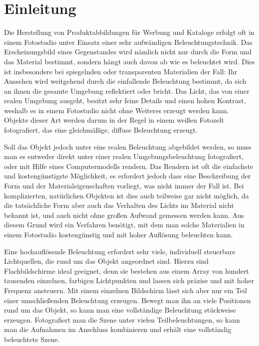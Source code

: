 \chapter{Einleitung}  \label{einleitung}

 Die Herstellung von Produktabbildungen für Werbung und Kataloge erfolgt oft in einem Fotostudio unter Einsatz einer sehr aufwändigen Beleuchtungstechnik.
 Das Erscheinungsbild eines Gegenstandes wird nämlich nicht nur durch die Form und das Material bestimmt, sondern hängt auch davon ab wie es beleuchtet wird.
  Dies ist insbesondere bei spiegelnden oder transparenten Materialien der Fall: Ihr Aussehen wird weitgehend durch die einfallende Beleuchtung bestimmt, da sich an ihnen die gesamte Umgebung reflektiert oder bricht.
  Das Licht, das von einer realen Umgebung ausgeht, besitzt sehr feine Details und einen hohen Kontrast, weshalb es in einem Fotostudio nicht ohne Weiteres erzeugt werden kann.
  Objekte dieser Art werden darum in der Regel in einem weißen Fotozelt fotografiert, das eine gleichmäßige, diffuse Beleuchtung erzeugt. 
  
  Soll das Objekt jedoch unter eine realen Beleuchtung abgebildet werden, so muss man es entweder direkt unter einer realen Umgebungsbeleuchtung fotografiert, oder mit Hilfe eines Computermodells rendern.
  Das Rendern ist oft die einfachste und kostengünstigste Möglichkeit, es erfordert jedoch dass eine Beschreibung der Form und der Materialeigenschaften vorliegt, was nicht immer der Fall ist.
  Bei komplizierten, natürlichen  Objekten ist dies auch teilweise gar nicht möglich, da die tatsächliche Form aber auch das Verhalten des Lichts im Material nicht bekannt ist, und auch nicht ohne großen Aufwand gemessen werden kann. 
  Aus diesem Grund wird ein Verfahren benötigt, mit dem man solche Materialien in einem Fotostudio kostengünstig und mit hoher Auflösung beleuchten kann.

  Eine hochauflösende Beleuchtung erfordert sehr viele, individuell steuerbare Lichtquellen, die rund um das Objekt angeordnet sind. 
  Hierzu sind Flachbildschirme ideal geeignet, denn sie bestehen aus einem Array von hundert tausenden einzelnen, farbigen Lichtpunkten und lassen sich präzise und mit hoher Frequenz ansteuern.
  Mit einem einzelnen Bildschirm lässt sich aber nur ein Teil einer umschließenden Beleuchtung erzeugen. 
  Bewegt man ihn an viele Positionen rund um das Objekt, so kann man eine vollständige Beleuchtung stückweise erzeugen.
  Fotografiert man die Szene unter vielen Teilbeleuchtungen, so kann man die Aufnahmen im Anschluss kombinieren und erhält eine vollständig beleuchtete Szene.
 


